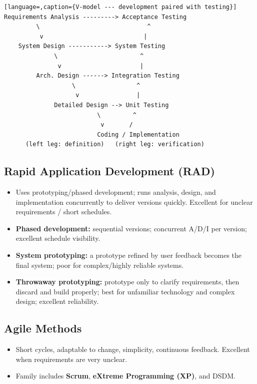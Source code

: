 \documentclass[hidelinks]{article}
\begin{document}
\begin{lstlisting}[language=,caption={V-model --- development paired with testing}]
Requirements Analysis ---------> Acceptance Testing
         \                              ^
          v                            |
    System Design -----------> System Testing
              \                       ^
               v                      |
         Arch. Design ------> Integration Testing
                   \                 ^
                    v                |
              Detailed Design --> Unit Testing
                          \         ^
                           v       /
                          Coding / Implementation
      (left leg: definition)   (right leg: verification)
\end{lstlisting}

\subsection{Rapid Application Development (RAD)}
\begin{itemize}
  \item Uses prototyping/phased development; runs analysis, design, and implementation
        concurrently to deliver versions quickly. Excellent for unclear requirements / short schedules.
  \item \textbf{Phased development:} sequential versions; concurrent A/D/I per version; excellent
        schedule visibility.
  \item \textbf{System prototyping:} a prototype refined by user feedback becomes the final system;
        poor for complex/highly reliable systems.
  \item \textbf{Throwaway prototyping:} prototype only to clarify requirements, then discard and
        build properly; best for unfamiliar technology and complex design; excellent reliability.
\end{itemize}

\subsection{Agile Methods}
\begin{itemize}
  \item Short cycles, adaptable to change, simplicity, continuous feedback. Excellent when
        requirements are very unclear.
  \item Family includes \textbf{Scrum}, \textbf{eXtreme Programming (XP)}, and DSDM.
\end{itemize}
\end{document}
